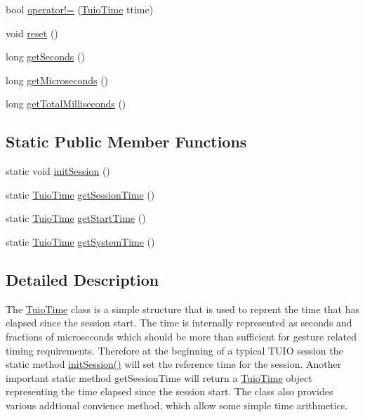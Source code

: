\begin{DoxyCompactItemize}
bool \hyperlink{class_t_u_i_o_1_1_tuio_time_a658bdc24d71d0ff9180fbde4fae8aa22}{operator!=} (\hyperlink{class_t_u_i_o_1_1_tuio_time}{Tuio\+Time} ttime)
\item 
void \hyperlink{class_t_u_i_o_1_1_tuio_time_aeb2bee6eae0ce633f015bf7958a348ac}{reset} ()
\item 
long \hyperlink{class_t_u_i_o_1_1_tuio_time_a7d50635899893b7fbbb05d8356576ccb}{get\+Seconds} ()
\item 
long \hyperlink{class_t_u_i_o_1_1_tuio_time_ac511e63e519d31b7eaab97dee0bea0cc}{get\+Microseconds} ()
\item 
long \hyperlink{class_t_u_i_o_1_1_tuio_time_a7e861c278e95080b6f087c8c32ed2561}{get\+Total\+Milliseconds} ()
\end{DoxyCompactItemize}
\subsection*{Static Public Member Functions}
\begin{DoxyCompactItemize}
\item 
static void \hyperlink{class_t_u_i_o_1_1_tuio_time_af7e2d2ec80cc6be6188469f5d31fdb94}{init\+Session} ()
\item 
static \hyperlink{class_t_u_i_o_1_1_tuio_time}{Tuio\+Time} \hyperlink{class_t_u_i_o_1_1_tuio_time_a04e3e660b895b349a26b0364401878b9}{get\+Session\+Time} ()
\item 
static \hyperlink{class_t_u_i_o_1_1_tuio_time}{Tuio\+Time} \hyperlink{class_t_u_i_o_1_1_tuio_time_a748fb038221433dd33ac52f80d7d9c3e}{get\+Start\+Time} ()
\item 
static \hyperlink{class_t_u_i_o_1_1_tuio_time}{Tuio\+Time} \hyperlink{class_t_u_i_o_1_1_tuio_time_aec89a336368b34d217f571942de40955}{get\+System\+Time} ()
\end{DoxyCompactItemize}


\subsection{Detailed Description}
The \hyperlink{class_t_u_i_o_1_1_tuio_time}{Tuio\+Time} class is a simple structure that is used to reprent the time that has elapsed since the session start. The time is internally represented as seconds and fractions of microseconds which should be more than sufficient for gesture related timing requirements. Therefore at the beginning of a typical T\+U\+IO session the static method \hyperlink{class_t_u_i_o_1_1_tuio_time_af7e2d2ec80cc6be6188469f5d31fdb94}{init\+Session()} will set the reference time for the session. Another important static method get\+Session\+Time will return a \hyperlink{class_t_u_i_o_1_1_tuio_time}{Tuio\+Time} object representing the time elapsed since the session start. The class also provides various addtional convience method, which allow some simple time arithmetics.

